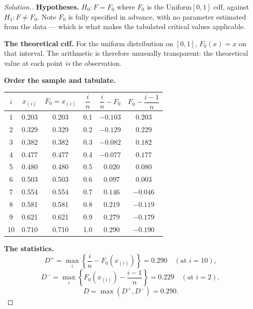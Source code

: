 \documentclass[11pt,a4paper]{article}
\theoremstyle{definition}
\newenvironment{solution}
  {\renewcommand{\qedsymbol}{}\begin{proof}[\textit{Solution}.]}
  {\end{proof}}
\begin{document}
\begin{solution}
\textbf{Hypotheses.} $H_0 : F = F_0$ where $F_0$ is the Uniform$[0,1]$ cdf, against
$H_1 : F \neq F_0$. Note $F_0$ is fully specified in advance, with no parameter
estimated from the data --- which is what makes the tabulated critical values
applicable.

\textbf{The theoretical cdf.} For the uniform distribution on $[0,1]$,
$F_0(x) = x$ on that interval. The arithmetic is therefore unusually transparent:
the theoretical value at each point \emph{is} the observation.

\textbf{Order the sample and tabulate.}
\begin{center}
\begin{tabular}{c|c|c|c|c|c}
$i$ & $x_{(i)}$ & $F_0 = x_{(i)}$ & $\dfrac{i}{n}$ & $\dfrac{i}{n}-F_0$
& $F_0 - \dfrac{i-1}{n}$\\
\hline
1  & 0.203 & 0.203 & 0.1 & $-0.103$ & $0.203$\\
2  & 0.329 & 0.329 & 0.2 & $-0.129$ & $0.229$\\
3  & 0.382 & 0.382 & 0.3 & $-0.082$ & $0.182$\\
4  & 0.477 & 0.477 & 0.4 & $-0.077$ & $0.177$\\
5  & 0.480 & 0.480 & 0.5 & $\ \ 0.020$ & $0.080$\\
6  & 0.503 & 0.503 & 0.6 & $\ \ 0.097$ & $0.003$\\
7  & 0.554 & 0.554 & 0.7 & $\ \ 0.146$ & $-0.046$\\
8  & 0.581 & 0.581 & 0.8 & $\ \ 0.219$ & $-0.119$\\
9  & 0.621 & 0.621 & 0.9 & $\ \ 0.279$ & $-0.179$\\
10 & 0.710 & 0.710 & 1.0 & $\ \ \mathbf{0.290}$ & $-0.190$\\
\hline
\end{tabular}
\end{center}

\textbf{The statistics.}
$$D^{+} = \max_i\left\{\dfrac{i}{n}-F_0\left(x_{(i)}\right)\right\} = 0.290
\quad(\text{at } i = 10),$$
$$D^{-} = \max_i\left\{F_0\left(x_{(i)}\right)-\dfrac{i-1}{n}\right\} = 0.229
\quad(\text{at } i = 2),$$
$$D = \max\left(D^{+}, D^{-}\right) = 0.290 .$$


\end{solution}
\end{document}
